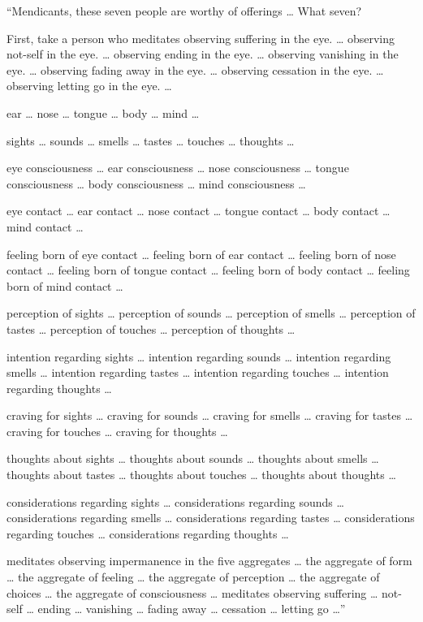 \documentclass[12pt,openany]{book}%
\begin{document}
“Mendicants, these seven people are worthy of offerings … What seven? 

First, take a person who meditates observing suffering in the eye. … observing not-self in the eye. … observing ending in the eye. … observing vanishing in the eye. … observing fading away in the eye. … observing cessation in the eye. … observing letting go in the eye. … 

ear … nose … tongue … body … mind … 

sights … sounds … smells … tastes … touches … thoughts … 

eye consciousness … ear consciousness … nose consciousness … tongue consciousness … body consciousness … mind consciousness … 

eye contact … ear contact … nose contact … tongue contact … body contact … mind contact … 

feeling born of eye contact … feeling born of ear contact … feeling born of nose contact … feeling born of tongue contact … feeling born of body contact … feeling born of mind contact … 

perception of sights … perception of sounds … perception of smells … perception of tastes … perception of touches … perception of thoughts … 

intention regarding sights … intention regarding sounds … intention regarding smells … intention regarding tastes … intention regarding touches … intention regarding thoughts … 

craving for sights … craving for sounds … craving for smells … craving for tastes … craving for touches … craving for thoughts … 

thoughts about sights … thoughts about sounds … thoughts about smells … thoughts about tastes … thoughts about touches … thoughts about thoughts … 

considerations regarding sights … considerations regarding sounds … considerations regarding smells … considerations regarding tastes … considerations regarding touches … considerations regarding thoughts … 

meditates observing impermanence in the five aggregates … the aggregate of form … the aggregate of feeling … the aggregate of perception … the aggregate of choices … the aggregate of consciousness … meditates observing suffering … not-self … ending … vanishing … fading away … cessation … letting go …” 
\end{document}
